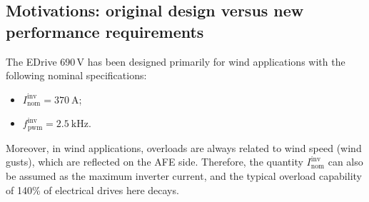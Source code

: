\documentclass[11pt,a4paper]{scrartcl}
\begin{document}
	\begin{onehalfspace}
		\begin{abstract}
			\small
			\textbf{This feasibility study investigates the potential adoption of the FF1200R17IP5P (Infineon) IGBT module as an alternative to the currently used DP650B1700 (Danfoss), FF650R17IE4 (Infineon), and FF650R17IE4DB2 (Infineon) in the 690\,V EDrive platform. In parallel to a theoretical power losses evaluation a series of Double Pulse Tests (DPTs) were carried out to characterize and compare the switching behavior of the main module DP650B1700 (Danfoss series)  and FF1200R17IP5P (new Infineon) under representative operating conditions. The evaluation also covers compatibility with both the legacy DB1.00 and the updated DB1.51 driver boards, in order to assess whether any hardware changes are required for a potential transition. The results and observations from this study aim to support the suitability of the FF1200R17IP5P as a replacement for the DP650B1700, FF650R17IE4DB2, and FF650R17IE4 modules.}
		\end{abstract}



		\section{Motivations: original design versus new performance requirements}
		The EDrive 690\,V has been designed primarily for wind applications with the following
		nominal specifications:
		\begin{itemize}
			\item[--] $I_\text{nom}^\text{inv} = \SI{370}{\ampere}$;
			\item[--] $f_\text{pwm}^\text{inv} = \SI{2.5}{\kilo\hertz}$.
		\end{itemize}
		Moreover, in wind applications, overloads are always related to wind speed (wind gusts), which are
		reflected on the AFE side. Therefore, the quantity $I_\text{nom}^\text{inv}$ can also be
		assumed as the maximum inverter current, and the typical overload capability of 140\% of electrical drives here decays.
		

\end{onehalfspace}
\end{document}
